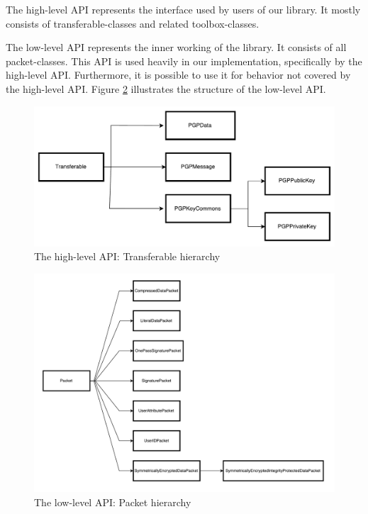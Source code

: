 The high-level API represents the interface used by users of our library. It mostly consists of transferable-classes and related toolbox-classes.

The low-level API represents the inner working of the library. It consists of all packet-classes. This API is used heavily in our implementation, specifically by the high-level API. Furthermore, it is possible to use it for behavior not covered by the high-level API. Figure \ref{fig:packethierarchy} illustrates the structure of the low-level API.

\begin{figure}[p]
	\centering
	\includegraphics[width=1\linewidth]{figures/TransferableHierarchy.pdf}
	\caption[]{The high-level API: Transferable hierarchy }
	\label{fig:transferablehierarchy}
\end{figure}

\begin{figure}[p]
	\centering
	\includegraphics[width=1\linewidth]{figures/PacketHierarchy.pdf}
	\caption[]{The low-level API: Packet hierarchy }
	\label{fig:packethierarchy}
\end{figure}


